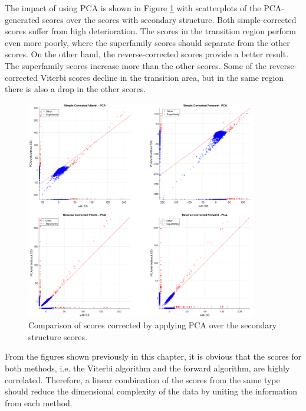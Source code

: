 The impact of using \ac{PCA} is shown in Figure \ref{fig:eval1CorrPCA} with scatterplots of the \ac{PCA}-generated scores over the scores with secondary structure. Both simple-corrected scores suffer from high deterioration. The scores in the transition region perform even more poorly, where the superfamily scores should separate from the other scores. On the other hand, the reverse-corrected scores provide a better result. The superfamily scores increase more than the other scores. Some of the reverse-corrected Viterbi scores decline in the transition area, but in the same region there is also a drop in the other scores.

\begin{figure}[H]
	\begin{center}
		\includegraphics[width=0.9\textwidth]{fig/PCA/corr_pca}
	\end{center}
	\caption[Comparison of scores corrected by applying \acs{PCA}. ]{Comparison of scores corrected by applying \acs{PCA} over the secondary structure scores.}
	\label{fig:eval1CorrPCA}
\end{figure}


From the figures shown previously in this chapter, it is obvious that the scores for both methods, i.e. the Viterbi algorithm and the forward algorithm, are highly correlated. Therefore, a linear combination of the scores from the same type should reduce the dimensional complexity of the data by uniting the information from each method. 

